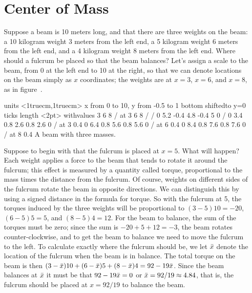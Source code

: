 \section{Center of Mass}{}{}
\nobreak
Suppose a beam is 10 meters long, and that there are three weights on
the beam: a 10 kilogram weight 3 meters from the left end, a 5
kilogram weight 6 meters from the left end, and a 4 kilogram weight 8
meters from the left end. Where should a fulcrum be placed so that the
beam balances? Let's assign a scale to the beam, from 0 at the left
end to 10 at the right, so that we can denote locations on the beam
simply as $x$ coordinates; the weights are at $x=3$, $x=6$, and $x=8$,
as in figure~.

\figure
\texonly
\vbox{\beginpicture
\normalgraphs
\ninepoint
\setcoordinatesystem units <1truecm,1truecm>
\setplotarea x from 0 to 10, y from -0.5 to 1
\axis bottom shiftedto y=0 ticks length <2pt>
  withvalues {3} {6} {8} / at 3 6 8 / /
\setlinear
{} 0 5.2 -0.4 4.8 -0.4 5 0 /
 0 3.4 0.8 2.6 0.8 2.6 0 /
 at 3 0.4
 0 6.4 0.8 5.6 0.8 5.6 0 /
 at 6 0.4
 0 8.4 0.8 7.6 0.8 7.6 0 /
 at 8 0.4
\endpicture}
\endtexonly
{}
\begincaption
A beam with three masses.
\endcaption
\endfigure


Suppose to begin with that the fulcrum is placed at $x=5$. What will
happen? Each weight applies a force to the beam that tends to rotate
it around the fulcrum; this effect is measured by a quantity called
{\dfont torque\/}, proportional to the mass times the
distance from the fulcrum. Of course, weights on different sides of
the fulcrum rotate the beam in opposite directions. We can distinguish
this by using a signed distance in the formula for torque. So with the
fulcrum at 5, the torques induced by the three weights will be
proportional to $(3-5)10=-20$, $(6-5)5=5$, and $(8-5)4=12$. For the
beam to balance, the sum of the torques must be zero; since the sum is
$-20+5+12=-3$, the beam rotates counter-clockwise, and to get the beam
to balance we need to move the fulcrum to the left. To calculate
exactly where the fulcrum should be, we let $\displaystyle \bar x$ denote the
location of the fulcrum when the beam is in balance. The total torque
on the beam is then $\displaystyle (3-\bar x)10+(6-\bar x)5+(8-\bar x)4=92-19\bar
x$. Since the beam balances at $\displaystyle \bar x$ it must be that
$\displaystyle 92-19\bar x=0$ or $\displaystyle \bar x=92/19\approx 4.84$, that is, the fulcrum
should be placed at $x=92/19$ to balance the beam.

